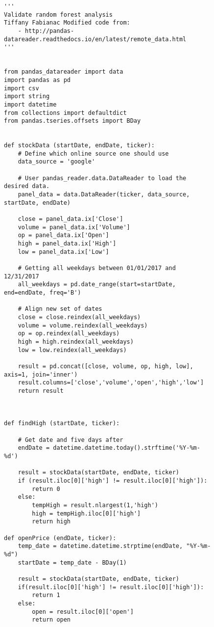 \documentclass[sigconf]{acmart}
\begin{document}
\begin{figure}[htb]
\begin{verbatim}
'''
Validate random forest analysis
Tiffany Fabianac Modified code from:
    - http://pandas-datareader.readthedocs.io/en/latest/remote_data.html
'''


from pandas_datareader import data
import pandas as pd
import csv
import string
import datetime
from collections import defaultdict
from pandas.tseries.offsets import BDay


def stockData (startDate, endDate, ticker):
	# Define which online source one should use
	data_source = 'google'

	# User pandas_reader.data.DataReader to load the desired data.
	panel_data = data.DataReader(ticker, data_source, startDate, endDate)

	close = panel_data.ix['Close']
	volume = panel_data.ix['Volume']
	op = panel_data.ix['Open']
	high = panel_data.ix['High']
	low = panel_data.ix['Low']

	# Getting all weekdays between 01/01/2017 and 12/31/2017
	all_weekdays = pd.date_range(start=startDate, end=endDate, freq='B')

	# Align new set of dates
	close = close.reindex(all_weekdays)
	volume = volume.reindex(all_weekdays)
	op = op.reindex(all_weekdays)
	high = high.reindex(all_weekdays)
	low = low.reindex(all_weekdays)

	result = pd.concat([close, volume, op, high, low], axis=1, join='inner')
	result.columns=['close','volume','open','high','low']
	return result


    
def findHigh (startDate, ticker):

	# Get date and five days after
	endDate = datetime.datetime.today().strftime('%Y-%m-%d')

	result = stockData(startDate, endDate, ticker)
	if (result.iloc[0]['high'] != result.iloc[0]['high']):
		return 0
	else:
		tempHigh = result.nlargest(1,'high')
		high = tempHigh.iloc[0]['high']
		return high

def openPrice (endDate, ticker):
	temp_date = datetime.datetime.strptime(endDate, "%Y-%m-%d")
	startDate = temp_date - BDay(1)

	result = stockData(startDate, endDate, ticker)
	if(result.iloc[0]['high'] != result.iloc[0]['high']):
		return 1
	else:
		open = result.iloc[0]['open']
		return open



\end{verbatim}
\end{figure}
\end{document}
